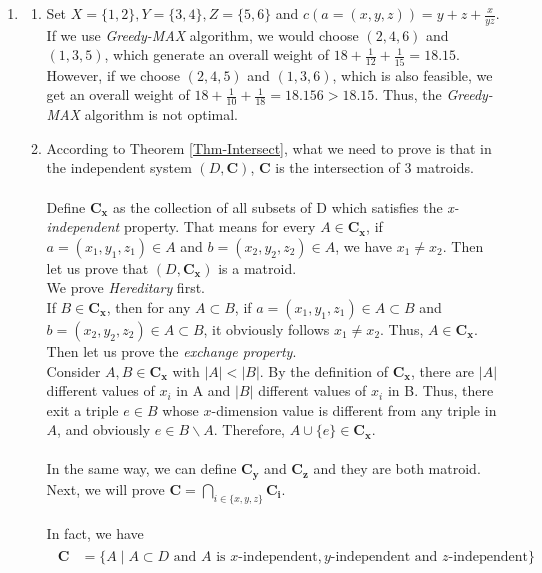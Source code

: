 \documentclass[12pt,a4paper]{article}
\makeatletter
\newtheorem*{solution}{Solution}
\theoremstyle{definition}
\renewenvironment{solution}[1][Solution] {\par\pushQED{\qed}\normalfont\topsep6\p@\@plus6\p@\relax\trivlist\item[\hskip\labelsep\bfseries#1\@addpunct{.}]\ignorespaces}{\popQED\endtrivlist\@endpefalse} \makeatother
\makeatother
\begin{document}
\begin{enumerate}
\begin{solution}
\begin{enumerate}
        \item
        Set $X = \{1,2\}, Y = \{3,4\}, Z = \{5,6\}$ and $c(a=(x,y,z)) = y+z+\frac{x}{yz}$. If we use \emph{Greedy-MAX} algorithm, we would choose $(2,4,6)$ and $(1,3,5)$, which generate an overall weight of $18+\frac{1}{12}+\frac{1}{15} = 18.15$. However, if we choose $(2,4,5)$ and $(1,3,6)$, which is also feasible, we get an overall weight of $18+\frac{1}{10}+\frac{1}{18} = 18.156>18.15$. Thus, the \emph{Greedy-MAX} algorithm is not optimal.
        
        \item
        According to Theorem \ref{Thm-Intersect}, what we need to prove is that in the independent system $(D,\mathbf{C})$, $\mathbf{C}$ is the intersection of $3$ matroids.\\
        ~\\
        Define $\mathbf{C_x}$ as the collection of all subsets of D which satisfies the \emph{x-independent} property. That means for every $A\in\mathbf{C_x}$, if $a = (x_1,y_1,z_1) \in A$ and $b = (x_2,y_2,z_2) \in A$, we have $x_1\neq x_2$. Then let us prove that $(D,\mathbf{C_x})$ is a matroid.\\
        We prove \emph{Hereditary} first.\\
        If $B\in\mathbf{C_x}$, then for any $A\subset B$, if $a = (x_1,y_1,z_1)\in A \subset B$ and  $b = (x_2,y_2,z_2)\in A \subset B$, it obviously follows $x_1\neq x_2$. Thus, $A\in \mathbf{C_x}$.\\
        Then let us prove the \emph{exchange property}.\\
        Consider $A,B \in \mathbf{C_x}$ with $|A|<|B|$. By the definition of $\mathbf{C_x}$, there are $|A|$ different values of $x_i$ in A and $|B|$ different values of $x_i$ in B. Thus, there exit a triple $e \in B$ whose $x$-dimension value is different from any triple in $A$, and obviously $e\in B\backslash A$. Therefore, $A\cup \{e\} \in \mathbf{C_x}$.\\
        ~\\
        In the same way, we can define $\mathbf{C_y}$ and $\mathbf{C_z}$ and they are both matroid. Next, we will prove $\mathbf{C} = \bigcap_{i \in \{x,y,z\}}\mathbf{C_i}$.\\
        ~\\
        In fact, we have
        \begin{align}
            \begin{split}
                \mathbf{C} &= \{A \mid A\subset D \text{ and } A \text{ is } x\text{-independent}, y\text{-independent} \text{ and }z\text{-independent}\}\\

\end{split}
\end{align}
\end{enumerate}
\end{solution}
\end{enumerate}
\end{document}
